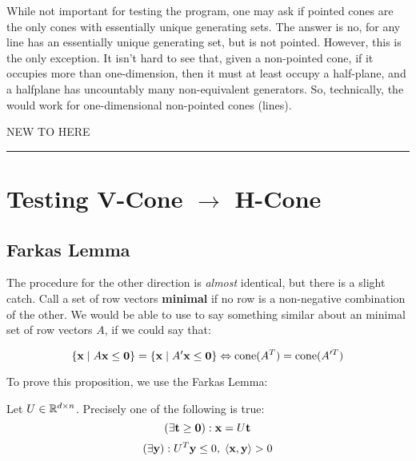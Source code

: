 \begin{Remark}
  While not important for testing the program, one may ask if pointed cones are the only cones with essentially unique generating sets.  The answer is no, for any line has an essentially unique generating set, but is not pointed.  However, this is the only exception.  It isn't hard to see that, given a non-pointed cone, if it occupies more than one-dimension, then it must at least occupy a half-plane, and a halfplane has uncountably many non-equivalent generators.  So, technically, the  would work for one-dimensional non-pointed cones (lines).
\end{Remark}

NEW TO HERE
\hrule
\section{Testing V-Cone $\to$ H-Cone}

\subsection{Farkas Lemma}
The procedure for the other direction is \textit{almost} identical, but there is a slight catch.  Call a set of row vectors \textbf{minimal} if no row is a non-negative combination of the other.  We would be able to use  to say something similar about an minimal set of row vectors $A$, if we could say that:

\begin{Thm}\label{dual_cone}
	\[ \left\{\mathbf{x}\;|\; A\mathbf{x}\leq\mathbf{0}\right\} = \left\{\mathbf{x}\;|\; A'\mathbf{x}\leq\mathbf{0}\right\} \Leftrightarrow \operatorname{cone}(A^T) = \operatorname{cone}(A'^T) \]
\end{Thm}

To prove this proposition, we use the Farkas Lemma:

\begin{Prop}\label{farkas_lemma}
	Let $U \in \mathbb{R}^{d\times n}$.  Precisely one of the following is true:
	\[ (\exists \mathbf{t} \geq \mathbf{0}) : \mathbf{x} = U\mathbf{t} \]
	\[ (\exists \mathbf{y}) : U^T\mathbf{y} \leq 0,\; \left\langle \mathbf{x}, \mathbf{y} \right\rangle > 0 \]
\end{Prop}

